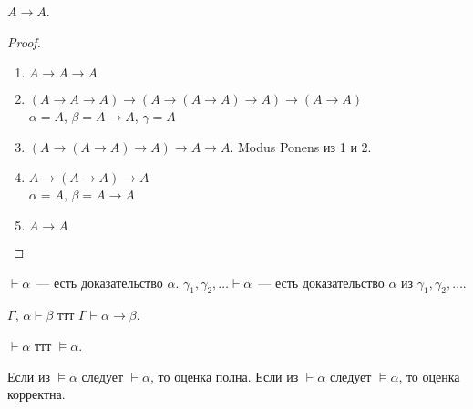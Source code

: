\documentclass{article}
\begin{document}
	\begin{statement}
		$A \rightarrow A$.
	\end{statement}
	\begin{proof}
		\begin{enumerate}
			\item $A \rightarrow A \rightarrow A$
			\item $(A \rightarrow A \rightarrow A) \rightarrow (A \rightarrow (A \rightarrow A) \rightarrow A) \rightarrow (A \rightarrow A)$ \\
			$\alpha = A$, $\beta = A \rightarrow A$, $\gamma = A$
			\item $(A \rightarrow (A \rightarrow A) \rightarrow A) \rightarrow A \rightarrow A$. Modus Ponens из 1 и 2.
			\item $A \rightarrow (A \rightarrow A) \rightarrow A $ \\
			$\alpha = A$, $\beta = A \rightarrow A$
			\item $A \rightarrow A$
		\end{enumerate}
	\end{proof}
	\begin{definition}
		$\vdash \alpha$~--- есть доказательство $\alpha$. $\gamma_1, \gamma_2, \dots \vdash \alpha$~--- есть доказательство $\alpha$ из $\gamma_1, \gamma_2, \dots$.
	\end{definition}
	\begin{theorem}
		$\Gamma$, $\alpha \vdash \beta$ ттт $\Gamma \vdash \alpha \rightarrow \beta$.
	\end{theorem}
	\begin{statement}
		$\vdash \alpha$ ттт $\vDash \alpha$.
	\end{statement}
	\begin{statement}
		Если из $\vDash \alpha$ следует $\vdash \alpha$, то оценка полна. Если из $\vdash \alpha$ следует $\vDash \alpha$, то оценка корректна.
	\end{statement}
\end{document}
